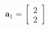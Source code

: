 \documentclass[preview]{standalone}
\begin{document}
\begin{align*}
\mathbf{a}_1=\begin{bmatrix} 2 \\ 2 \end{bmatrix}
\end{align*}
\end{document}
